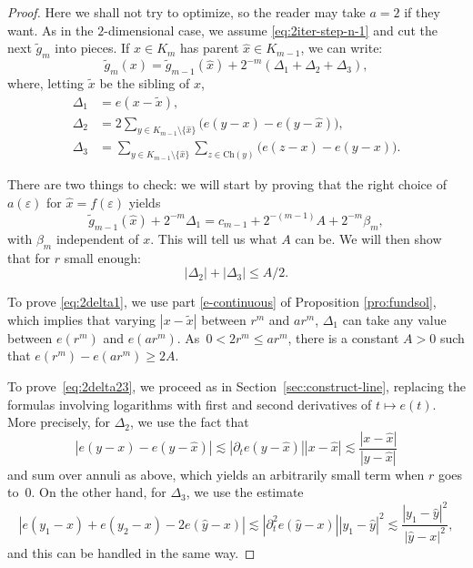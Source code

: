 \documentclass[10pt]{amsart}
\let\backslash\setminus
\let\wt\widetilde
\let\wh\widehat
\numberwithin{equation}{section}
\theoremstyle{plain}
\theoremstyle{definition}
\begin{document}
\begin{proof}
Here we shall not try to optimize, so the reader may take $a = 2$ if they want.
As in the $2$-dimensional case, we assume \eqref{eq:2iter-step-n-1} and
cut the next $\wt g_m$ into pieces.
If $x\in K_m$ has parent $\wh x\in K_{m-1}$, we can write:
\begin{equation*}
\wt g_{m}(x) =\wt g_{m-1}(\wh x) + 2^{-m} (\Delta_1+ \Delta_2+\Delta_3),
\end{equation*}
where, letting $\wt x$ be the sibling of $x$,
\begin{align*}
\Delta_1 &= e(x- \wt x),\\
\Delta_2 &= 2 \sum_{y\in K_{m-1}\backslash \{\wh x\}} \big ( e(y-x)-e(y-\wh x)\big),\\
\tag*{and}
\Delta_3 &= \sum_{y\in K_{m-1}\backslash \{\wh x\}}\sum_{z\in \mathrm{Ch}(y)} \big ( e(z-x)-e(y-x)\big).
\end{align*}

There are two things to check: we will start by proving
that the right choice of $a(\varepsilon)$ for $\wh x=f(\varepsilon)$ yields
\begin{equation}\label{eq:2delta1}
\wt g_{m-1}(\wh x) + 2^{-m} \Delta_1 = c_{m-1} + 2^{-(m-1)}A + 2^{-m}\beta_m ,
\end{equation}
with $\beta_m$ independent of $x$. This will tell us what $A$ can be. We will then show that for $r$ small enough:
\begin{equation}\label{eq:2delta23}
|\Delta_2|+|\Delta_3|\leq A/2.
\end{equation}

To prove \eqref{eq:2delta1}, we use part \eqref{e-continuous} of Proposition \ref{pro:fundsol}, which implies that varying \hbox{$|x-\wt x|$} between $r^m$ and $a r^m$, $\Delta_1$ can take any value between $e(r^m)$ and $e(a r^m)$.
As~\hbox{$0 < 2 r^m \leq a r^m$},
there is a constant $A>0$ such that $e(r^m)-e(ar^m)\ge 2A$.

To prove~\eqref{eq:2delta23}, we proceed as in Section~\ref{sec:construct-line},
replacing the formulas involving logarithms with first and second derivatives of $t\mapsto e(t)$. More precisely, for $\Delta_2$, we use the fact that
\begin{equation*}
|e(y-x) - e(y-\wh x)| \lesssim |\partial_t e(y-\wh x)| |x-\wh x| \lesssim \dfrac{ |x-\wh x|}{|y-\wh x|}
\end{equation*}
and sum over annuli as above, which yields an arbitrarily small term when $r$ goes to~$0$. On the other hand, for $\Delta_3$, we use the estimate
\begin{equation*}
|e(y_1-x) + e(y_2 - x) -2 e(\wh y-x)| \lesssim |\partial_t^2e(\wh y-x)| |y_1-\wh y|^2 \lesssim \dfrac{ |y_1-\wh y|^2}{|\wh y-x|^2},
\end{equation*}
and this can be handled in the same way.


\end{proof}
\end{document}
